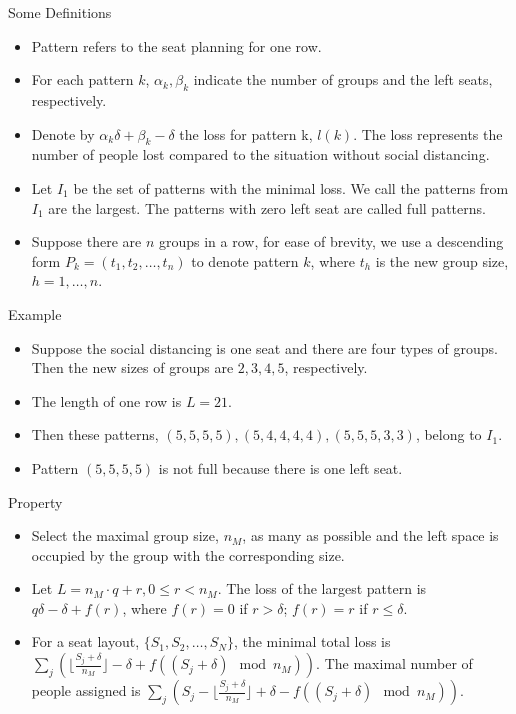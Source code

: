   \begin{frame}{Some Definitions}
    \begin{itemize}
      \item Pattern refers to the seat planning for one row.
      \item For each pattern $k$, $\alpha_k, \beta_k$ indicate the number of groups and the left seats, respectively.
      \item Denote by $\alpha_k \delta + \beta_k - \delta$ the loss for pattern k, $l(k)$. The loss represents the number of people lost compared to the situation without social distancing.
      \item Let $I_1$ be the set of patterns with the minimal loss. We call the patterns from $I_1$ are the largest. The patterns with zero left seat are called full patterns.
      \item Suppose there are $n$ groups in a row, for ease of brevity, we use a descending form $P_{k} = (t_1, t_2, \ldots, t_n)$ to denote pattern $k$, where $t_h$ is the new group size, $h = 1,\ldots, n$.
    \end{itemize}
  \end{frame}

  \begin{frame}{Example}
    \begin{itemize}
      \item Suppose the social distancing is one seat and there are four types of groups. Then the new sizes of groups are $2, 3, 4, 5$, respectively. 
      \item The length of one row is $L = 21$.
      \item Then these patterns, $(5, 5, 5, 5), (5, 4, 4, 4, 4),(5, 5, 5, 3, 3)$, belong to $I_1$.
      \item Pattern $(5, 5, 5, 5)$ is not full because there is one left seat.
    \end{itemize}
  \end{frame}

  \begin{frame}{Property}
    \begin{itemize}
      \item Select the maximal group size, $n_{M}$, as many as possible and the left space is occupied by the group with the corresponding size.
      \item Let $L = n_{M} \cdot q + r, 0 \leq r < n_{M}$. The loss of the largest pattern is $q \delta -\delta + f(r)$, where $f(r) =0$ if $r > \delta$; $f(r) = r$ if $r \leq \delta$.
      \item For a seat layout, $\{S_1, S_2, \ldots, S_{N}\}$, the minimal total loss is $\sum_{j} (\lfloor \frac{S_j+\delta}{n_{M}} \rfloor -\delta + f((S_j + \delta) \mod n_{M}))$. The maximal number of people assigned is $\sum_{j} (S_j - \lfloor \frac{S_j+\delta}{n_{M}} \rfloor + \delta - f((S_j +\delta)\mod n_{M}))$.
    \end{itemize}
  \end{frame}
  
